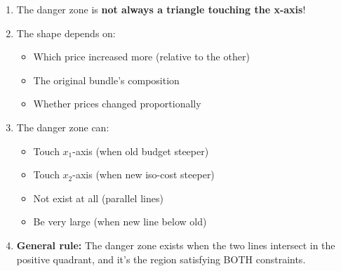 \documentclass[11pt]{article}
\begin{document}
\begin{enumerate}
\item The danger zone is \textbf{not always a triangle touching the x-axis}!

\item The shape depends on:
\begin{itemize}
\item Which price increased more (relative to the other)
\item The original bundle's composition
\item Whether prices changed proportionally
\end{itemize}

\item The danger zone can:
\begin{itemize}
\item Touch $x_1$-axis (when old budget steeper)
\item Touch $x_2$-axis (when new iso-cost steeper)
\item Not exist at all (parallel lines)
\item Be very large (when new line below old)
\end{itemize}

\item \textbf{General rule:} The danger zone exists when the two lines intersect in the positive quadrant, and it's the region satisfying BOTH constraints.
\end{enumerate}
\end{document}
